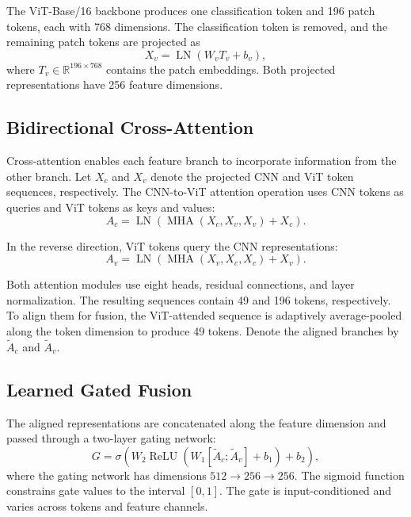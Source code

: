 \documentclass[12pt,a4paper,oneside]{article}
\begin{document}
The ViT-Base/16 backbone produces one classification token and
196 patch tokens, each with 768 dimensions. The classification token
is removed, and the remaining patch tokens are projected as
\begin{equation}
X_v = \operatorname{LN}(W_v T_v + b_v),
\end{equation}
where $T_v \in \mathbb{R}^{196 \times 768}$ contains the patch
embeddings. Both projected representations have 256 feature
dimensions.

\subsection{Bidirectional Cross-Attention}

Cross-attention enables each feature branch to incorporate information
from the other branch. Let $X_c$ and $X_v$ denote the projected CNN
and ViT token sequences, respectively. The CNN-to-ViT attention
operation uses CNN tokens as queries and ViT tokens as keys and values:
\begin{equation}
A_c = \operatorname{LN}\left(
\operatorname{MHA}(X_c,X_v,X_v)+X_c
\right).
\end{equation}

In the reverse direction, ViT tokens query the CNN representations:
\begin{equation}
A_v = \operatorname{LN}\left(
\operatorname{MHA}(X_v,X_c,X_c)+X_v
\right).
\end{equation}

Both attention modules use eight heads, residual connections, and
layer normalization. The resulting sequences contain 49 and 196
tokens, respectively. To align them for fusion, the ViT-attended
sequence is adaptively average-pooled along the token dimension to
produce 49 tokens. Denote the aligned branches by $\widetilde{A}_c$
and $\widetilde{A}_v$.

\subsection{Learned Gated Fusion}

The aligned representations are concatenated along the feature
dimension and passed through a two-layer gating network:
\begin{equation}
G = \sigma\left(
W_2 \operatorname{ReLU}
\left(W_1[\widetilde{A}_c;\widetilde{A}_v]+b_1\right)
+b_2\right),
\end{equation}
where the gating network has dimensions $512 \rightarrow 256
\rightarrow 256$. The sigmoid function constrains gate values to
the interval $[0,1]$. The gate is input-conditioned and varies
across tokens and feature channels.
\end{document}
